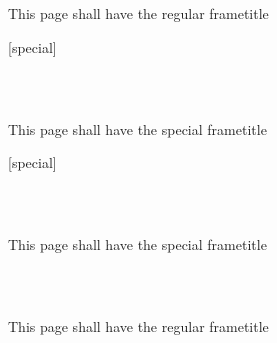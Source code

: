 \documentclass{beamer}
\begin{document}
\begin{frame}
\frametitle{~}
This page shall have the regular frametitle
\end{frame}

{
[special]
\begin{frame}
\frametitle{~}
This page shall have the special frametitle
\end{frame}
}

{
\begin{frame}
[special]
\frametitle{~}
This page shall have the special frametitle
\end{frame}
}

\begin{frame}
\frametitle{~}
This page shall have the regular frametitle
\end{frame}
\end{document}

